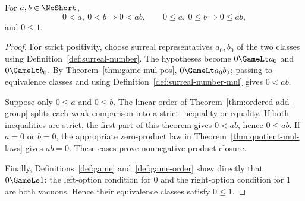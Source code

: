 \begin{theorem}
  \label{thm:quotient-mul-pos}
  \leanok
  For \(a,b\in\NoShort\),
  \[
    0<a,\ 0<b\Longrightarrow 0<ab,
    \qquad
    0\leq a,\ 0\leq b\Longrightarrow 0\leq ab,
  \]
  and \(0\leq1\).
\end{theorem}
\begin{proof}
  \leanok
  For strict positivity, choose surreal representatives \(a_0,b_0\) of the
  two classes using Definition~\ref{def:surreal-number}.  The hypotheses become
  \(0\GameLt a_0\) and \(0\GameLt b_0\).  By
  Theorem~\ref{thm:game-mul-pos}, \(0\GameLt a_0b_0\); passing to equivalence
  classes and using Definition~\ref{def:surreal-number-mul} gives \(0<ab\).

  Suppose only \(0\leq a\) and \(0\leq b\).  The linear order of
  Theorem~\ref{thm:ordered-add-group} splits each weak comparison into a strict
  inequality or equality.  If both inequalities are strict, the first part of
  this theorem gives \(0<ab\), hence \(0\leq ab\).  If \(a=0\) or \(b=0\),
  the appropriate zero-product law in Theorem~\ref{thm:quotient-mul-laws}
  gives \(ab=0\).  These cases prove nonnegative-product closure.

  Finally, Definitions~\ref{def:game} and~\ref{def:game-order} show directly
  that \(0\GameLe1\): the left-option condition for \(0\) and the right-option
  condition for \(1\) are both vacuous.  Hence their equivalence classes
  satisfy \(0\leq1\).
\end{proof}

